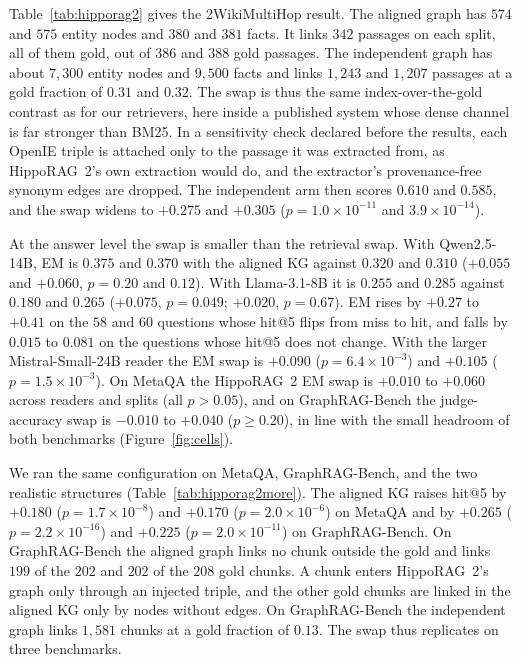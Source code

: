 \documentclass[11pt]{article}
\begin{document}
Table~\ref{tab:hipporag2} gives the 2WikiMultiHop result. The aligned graph has $574$ and $575$ entity nodes and $380$ and $381$ facts. It links $342$ passages on each split, all of them gold, out of $386$ and $388$ gold passages. The independent graph has about $7{,}300$ entity nodes and $9{,}500$ facts and links $1{,}243$ and $1{,}207$ passages at a gold fraction of $0.31$ and $0.32$. The swap is thus the same index-over-the-gold contrast as for our retrievers, here inside a published system whose dense channel is far stronger than BM25. In a sensitivity check declared before the results, each OpenIE triple is attached only to the passage it was extracted from, as HippoRAG~2's own extraction would do, and the extractor's provenance-free synonym edges are dropped. The independent arm then scores $0.610$ and $0.585$, and the swap widens to $+0.275$ and $+0.305$ ($p=1.0\times10^{-11}$ and $3.9\times10^{-14}$).

At the answer level the swap is smaller than the retrieval swap. With Qwen2.5-14B, EM is $0.375$ and $0.370$ with the aligned KG against $0.320$ and $0.310$ ($+0.055$ and $+0.060$, $p=0.20$ and $0.12$). With Llama-3.1-8B it is $0.255$ and $0.285$ against $0.180$ and $0.265$ ($+0.075$, $p=0.049$; $+0.020$, $p=0.67$). EM rises by $+0.27$ to $+0.41$ on the $58$ and $60$ questions whose hit@5 flips from miss to hit, and falls by $0.015$ to $0.081$ on the questions whose hit@5 does not change. With the larger Mistral-Small-24B reader the EM swap is $+0.090$ ($p=6.4\times10^{-3}$) and $+0.105$ ($p=1.5\times10^{-3}$). On MetaQA the HippoRAG~2 EM swap is $+0.010$ to $+0.060$ across readers and splits (all $p>0.05$), and on GraphRAG-Bench the judge-accuracy swap is $-0.010$ to $+0.040$ ($p\geq0.20$), in line with the small headroom of both benchmarks (Figure~\ref{fig:cells}).

We ran the same configuration on MetaQA, GraphRAG-Bench, and the two realistic structures (Table~\ref{tab:hipporag2more}). The aligned KG raises hit@5 by $+0.180$ ($p=1.7\times10^{-8}$) and $+0.170$ (\mbox{$p=2.0\times10^{-6}$}) on MetaQA and by $+0.265$ (\mbox{$p=2.2\times10^{-16}$}) and $+0.225$ ($p=2.0\times10^{-11}$) on GraphRAG-Bench. On GraphRAG-Bench the aligned graph links no chunk outside the gold and links $199$ of the $202$ and $202$ of the $208$ gold chunks. A chunk enters HippoRAG~2's graph only through an injected triple, and the other gold chunks are linked in the aligned KG only by nodes without edges. On GraphRAG-Bench the independent graph links $1{,}581$ chunks at a gold fraction of $0.13$. The swap thus replicates on three benchmarks.
\end{document}
